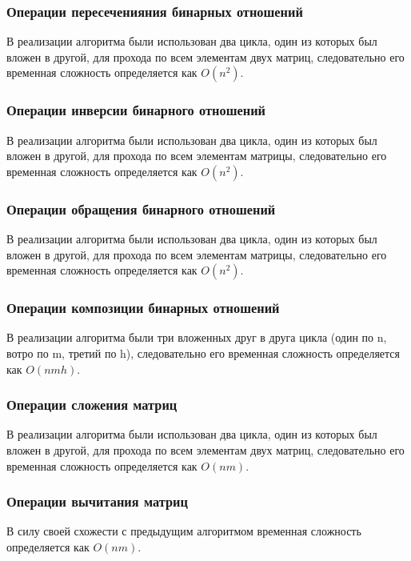 \documentclass[spec, och, labwork]{shiza}
\begin{document}
    \subsubsection{Операции пересеченияния бинарных отношений}
            В реализации алгоритма были использован два цикла, один из которых был вложен в другой, для прохода по всем элементам двух матриц, следовательно его временная сложность определяется как $O(n^2)$.
            
    \subsubsection{Операции инверсии бинарного отношений}
            В реализации алгоритма были использован два цикла, один из которых был вложен в другой, для прохода по всем элементам матрицы, следовательно его временная сложность определяется как $O(n^2)$.
    
    \subsubsection{Операции обращения бинарного отношений}
            В реализации алгоритма были использован два цикла, один из которых был вложен в другой, для прохода по всем элементам матрицы, следовательно его временная сложность определяется как $O(n^2)$.
    
    \subsubsection{Операции композиции бинарных отношений}
            В реализации алгоритма были три вложенных друг в друга цикла (один по n, вотро по m, третий по h), следовательно его временная сложность определяется как $O(nmh)$.

    \subsubsection{Операции сложения матриц}
            В реализации алгоритма были использован два цикла, один из которых был вложен в другой, для прохода по всем элементам двух матриц, следовательно его временная сложность определяется как $O(nm)$.

    \subsubsection{Операции вычитания матриц}
            В силу своей схожести с предыдущим алгоритмом временная сложность определяется как $O(nm)$.
\end{document}
